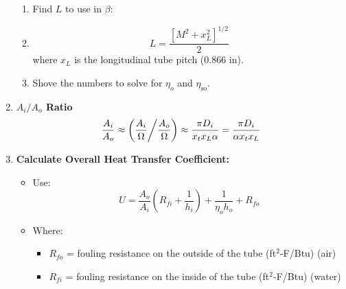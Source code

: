 \begin{multicols*}{2}
\begin{enumerate}
\begin{enumerate}[label=\roman*.]
                  \item Find $L$ to use in $\beta$:
                  \item \[
                            L = \frac{\left[M^2 + x_L^2\right]^{1/2}}{2}
                        \]
                        where $x_L$ is the longitudinal tube pitch (0.866 in).
                  \item Shove the numbers to solve for $\eta_o$ and $\eta_{\text{so}}$.
              \end{enumerate}
        \item \textbf{$A_i/A_o$ Ratio}
              \[
                  \frac{A_i}{A_o} \approx \left( \frac{A_i}{\Omega} \middle/ \frac{A_o}{\Omega} \right) \approx \frac{\pi D_i}{x_t x_L \alpha} = \frac{\pi D_i}{\alpha x_t x_L}
              \]

        \item \textbf{Calculate Overall Heat Transfer Coefficient:}
              \begin{itemize}
                  \item Use:
                        \[
                            U =  \frac{A_o}{A_i}\left(R_{fi} + \frac{1}{h_i} \right) + \frac{1}{\eta_o h_o} + R_{fo}
                        \]
                  \item Where:
                        \begin{itemize}
                            \item $R_{fo}$ = fouling resistance on the outside of the tube (ft$^2$-F/Btu) (air)
                            \item $R_{fi}$ = fouling resistance on the inside of the tube (ft$^2$-F/Btu) (water)
                        \end{itemize}
              \end{itemize}



\end{enumerate}
\end{multicols*}
